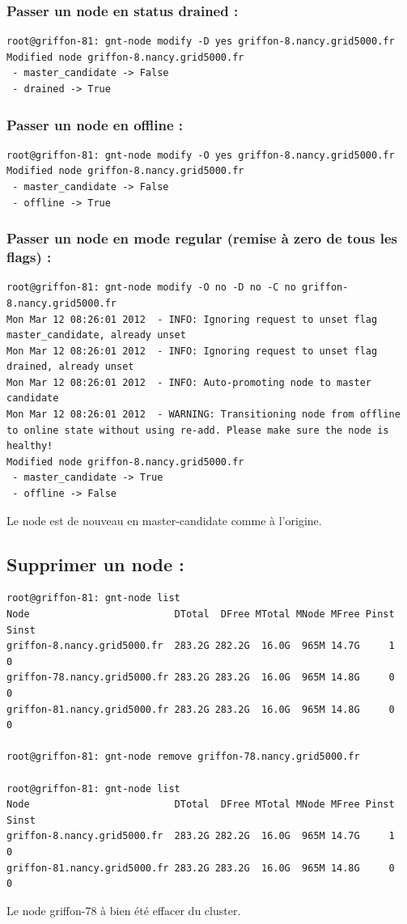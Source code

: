 \subsubsection {Passer un node en status drained :}
\begin{lstlisting}
root@griffon-81: gnt-node modify -D yes griffon-8.nancy.grid5000.fr
Modified node griffon-8.nancy.grid5000.fr
 - master_candidate -> False
 - drained -> True
\end{lstlisting}
\subsubsection {Passer un node en offline :}
\begin{lstlisting}
root@griffon-81: gnt-node modify -O yes griffon-8.nancy.grid5000.fr
Modified node griffon-8.nancy.grid5000.fr
 - master_candidate -> False
 - offline -> True
\end{lstlisting}
\subsubsection {Passer un node en mode regular (remise à zero de tous les flags) :}
\begin{lstlisting}
root@griffon-81: gnt-node modify -O no -D no -C no griffon-8.nancy.grid5000.fr
Mon Mar 12 08:26:01 2012  - INFO: Ignoring request to unset flag master_candidate, already unset
Mon Mar 12 08:26:01 2012  - INFO: Ignoring request to unset flag drained, already unset
Mon Mar 12 08:26:01 2012  - INFO: Auto-promoting node to master candidate
Mon Mar 12 08:26:01 2012  - WARNING: Transitioning node from offline to online state without using re-add. Please make sure the node is healthy!
Modified node griffon-8.nancy.grid5000.fr
 - master_candidate -> True
 - offline -> False
\end{lstlisting}
Le node est de nouveau en master-candidate comme à l'origine.

\subsection {Supprimer un node :}
\begin{lstlisting}
root@griffon-81: gnt-node list
Node                         DTotal  DFree MTotal MNode MFree Pinst Sinst
griffon-8.nancy.grid5000.fr  283.2G 282.2G  16.0G  965M 14.7G     1     0
griffon-78.nancy.grid5000.fr 283.2G 283.2G  16.0G  965M 14.8G     0     0
griffon-81.nancy.grid5000.fr 283.2G 283.2G  16.0G  965M 14.8G     0     0

root@griffon-81: gnt-node remove griffon-78.nancy.grid5000.fr

root@griffon-81: gnt-node list
Node                         DTotal  DFree MTotal MNode MFree Pinst Sinst
griffon-8.nancy.grid5000.fr  283.2G 282.2G  16.0G  965M 14.7G     1     0
griffon-81.nancy.grid5000.fr 283.2G 283.2G  16.0G  965M 14.8G     0     0
\end{lstlisting}
Le node griffon-78 à bien été effacer du cluster.

